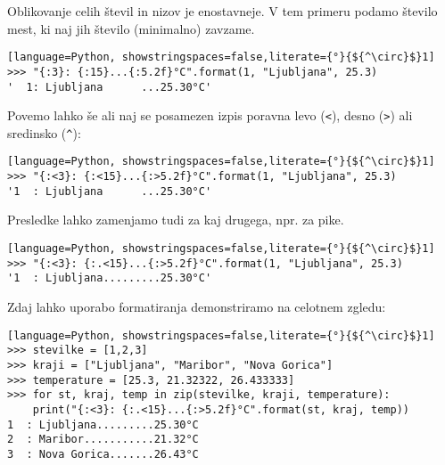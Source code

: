 Oblikovanje celih števil in nizov je enostavneje. V tem primeru podamo število mest, ki naj jih število (minimalno) zavzame. 

\begin{lstlisting}[language=Python, showstringspaces=false,literate={°}{${^\circ}$}1]
>>> "{:3}: {:15}...{:5.2f}°C".format(1, "Ljubljana", 25.3)
'  1: Ljubljana      ...25.30°C'
\end{lstlisting}
Povemo lahko še ali naj se posamezen izpis poravna levo (\texttt{<}), desno (\texttt{>}) ali sredinsko (\texttt{\^}):
\begin{lstlisting}[language=Python, showstringspaces=false,literate={°}{${^\circ}$}1]
>>> "{:<3}: {:<15}...{:>5.2f}°C".format(1, "Ljubljana", 25.3)
'1  : Ljubljana      ...25.30°C'
\end{lstlisting}
Presledke lahko zamenjamo tudi za kaj drugega, npr. za pike.
\begin{lstlisting}[language=Python, showstringspaces=false,literate={°}{${^\circ}$}1]
>>> "{:<3}: {:.<15}...{:>5.2f}°C".format(1, "Ljubljana", 25.3)
'1  : Ljubljana.........25.30°C'
\end{lstlisting}
Zdaj lahko uporabo formatiranja demonstriramo na celotnem zgledu:
\begin{lstlisting}[language=Python, showstringspaces=false,literate={°}{${^\circ}$}1]
>>> stevilke = [1,2,3]
>>> kraji = ["Ljubljana", "Maribor", "Nova Gorica"]
>>> temperature = [25.3, 21.32322, 26.433333]
>>> for st, kraj, temp in zip(stevilke, kraji, temperature):
	print("{:<3}: {:.<15}...{:>5.2f}°C".format(st, kraj, temp))
1  : Ljubljana.........25.30°C
2  : Maribor...........21.32°C
3  : Nova Gorica.......26.43°C
\end{lstlisting}


